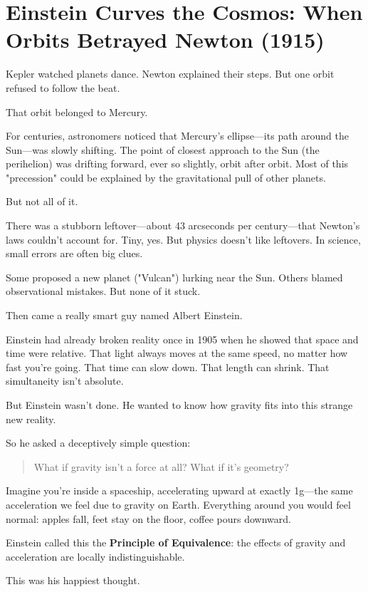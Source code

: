 \section{Einstein Curves the Cosmos: When Orbits Betrayed Newton (1915)}

Kepler watched planets dance. Newton explained their steps. But one orbit refused to follow the beat.

That orbit belonged to Mercury.

For centuries, astronomers noticed that Mercury’s ellipse—its path around the Sun—was slowly shifting. The point of closest approach to the Sun (the perihelion) was drifting forward, ever so slightly, orbit after orbit. Most of this "precession" could be explained by the gravitational pull of other planets.

But not all of it.

There was a stubborn leftover—about 43 arcseconds per century—that Newton’s laws couldn’t account for. Tiny, yes. But physics doesn’t like leftovers. In science, small errors are often big clues.

Some proposed a new planet ("Vulcan") lurking near the Sun. Others blamed observational mistakes. But none of it stuck.

Then came a really smart guy named Albert Einstein.

Einstein had already broken reality once in 1905 when he showed that space and time were relative. That light always moves at the same speed, no matter how fast you’re going. That time can slow down. That length can shrink. That simultaneity isn’t absolute.

But Einstein wasn’t done. He wanted to know how gravity fits into this strange new reality.

So he asked a deceptively simple question:

\begin{quote}
What if gravity isn’t a force at all? What if it’s geometry?
\end{quote}

Imagine you’re inside a spaceship, accelerating upward at exactly 1g—the same acceleration we feel due to gravity on Earth. Everything around you would feel normal: apples fall, feet stay on the floor, coffee pours downward.

Einstein called this the \textbf{Principle of Equivalence}: the effects of gravity and acceleration are locally indistinguishable.

This was his happiest thought.

